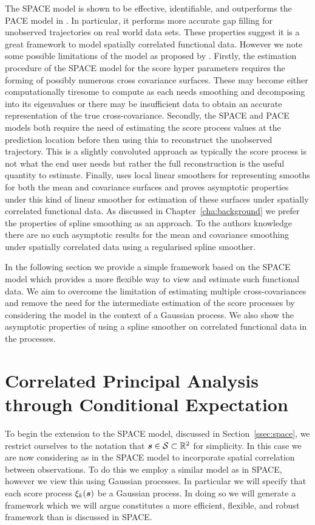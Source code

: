 The SPACE model is shown to be effective, identifiable, and outperforms the PACE model in \citep{liu_functional_2017}.
In particular, it performs more accurate gap filling for unobserved trajectories on real world data sets.
These properties suggest it is a great framework to model spatially correlated functional data.
However we note some possible limitations of the model as proposed by \citep{liu_functional_2017}.
Firstly, the estimation procedure of the SPACE model for the score hyper parameters requires the forming of possibly numerous cross covariance surfaces.
These may become either computationally tiresome to compute as each needs smoothing and decomposing into its eigenvalues or there may be insufficient data to obtain an accurate representation of the true cross-covariance. 
Secondly, the SPACE and PACE models both require the need of estimating the score process values at the prediction location before then using this to reconstruct the unobserved trajectory.
This is a slightly convoluted approach as typically the score process is not what the end user needs but rather the full reconstruction is the useful quantity to estimate. 
Finally, \citep{liu_functional_2017} uses local linear smoothers for representing smooths for both the mean and covariance surfaces and proves asymptotic properties under this kind of linear smoother for estimation of these surfaces under spatially correlated functional data.
As discussed in Chapter~\ref{cha:background} we prefer the properties of spline smoothing as an approach.
To the authors knowledge there are no such asymptotic results for the mean and covariance smoothing under spatially correlated data using a regularised spline smoother. 

In the following section we provide a simple framework based on the SPACE model which provides a more flexible way to view and estimate such functional data.
We aim to overcome the limitation of estimating multiple cross-covariances and remove the need for the intermediate estimation of the score processes by considering the model in the context of a Gaussian process. 
We also show the asymptotic properties of using a spline smoother on correlated functional data in the processes.

\section{Correlated Principal Analysis through Conditional Expectation} 
To begin the extension to the SPACE model, discussed in Section~\ref{ssec:space}, we restrict ourselves to the notation that $\bm{{s}} \in \mathcal{S} \subset \mathbb{R}^2$ for simplicity.
In this case we are now considering as in the SPACE model to incorporate spatial correlation between observations. 
To do this we employ a similar model as in SPACE, however we view this using Gaussian processes.
In particular we will specify that each score process $\xi_k(\bm{{s}})$ be a Gaussian process.
In doing so we will generate a framework which we will argue constitutes a more efficient, flexible, and robust framework than is discussed in SPACE. 

